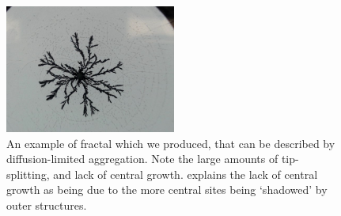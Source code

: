 \documentclass{article}
\theoremstyle{definition}
\theoremstyle{remark}
\begin{document}
\begin{figure}
        \centering
        \includegraphics[width=0.5\textwidth]{fractal images/Fractals_25M_3V.jpg}
        \caption{\label{fig:DLA} An example of fractal which we produced, that can be described by diffusion-limited aggregation. Note the large amounts of tip-splitting, and lack of central growth. \cite{1981PhRvL..47.1400W} explains the lack of central growth as being due to the more central sites being `shadowed' by outer structures.}
\end{figure}
\end{document}
